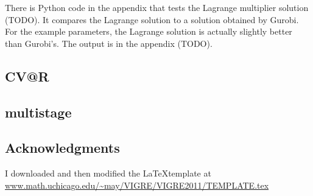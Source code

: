 \documentclass{amsart}
\theoremstyle{definition}
\theoremstyle{remark}
\begin{document}
There is Python code in the appendix that tests the Lagrange multiplier solution (TODO). It compares the Lagrange solution to a solution obtained by Gurobi. For the example parameters, the Lagrange solution is actually slightly better than Gurobi's. The output is in the appendix (TODO).

\subsection{CV@R}


\subsection{multistage}

\subsection*{Acknowledgments}  I downloaded and then modified the \LaTeX template at \url{www.math.uchicago.edu/~may/VIGRE/VIGRE2011/TEMPLATE.tex}



\end{document}
